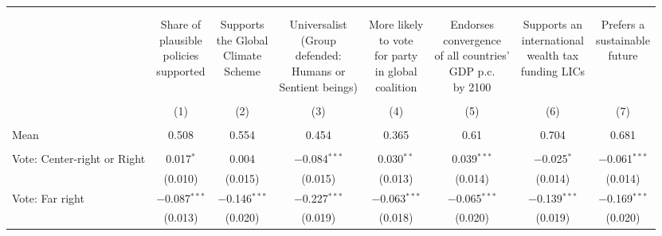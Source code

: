 
\begin{tabular}{@{\extracolsep{5pt}}lccccccc} 
\\[-1.8ex]\hline 
\hline \\[-1.8ex] 
\\[-1.8ex] & \makecell{Share of\\plausible\\policies\\supported} & \makecell{Supports\\the Global\\Climate\\Scheme} & \makecell{Universalist\\(Group\\defended:\\Humans or\\Sentient beings)} & \makecell{More likely\\to vote\\for party\\in global\\coalition} & \makecell{Endorses\\convergence\\of all countries'\\GDP p.c.\\by 2100} & \makecell{Supports an\\international\\wealth tax\\funding LICs} & \makecell{Prefers a\\sustainable\\future} \\ 
\\[-1.8ex] & (1) & (2) & (3) & (4) & (5) & (6) & (7)\\ 
\hline \\[-1.8ex] 
Mean & 0.508 & 0.554 & 0.454 & 0.365 & 0.61 & 0.704 & 0.681  \\ \hline \\[-1.8ex]
 Vote: Center\mbox{-}right or Right & 0.017$^{*}$ & 0.004 & $-$0.084$^{***}$ & 0.030$^{**}$ & 0.039$^{***}$ & $-$0.025$^{*}$ & $-$0.061$^{***}$ \\ 
  & (0.010) & (0.015) & (0.015) & (0.013) & (0.014) & (0.014) & (0.014) \\ 
  Vote: Far right & $-$0.087$^{***}$ & $-$0.146$^{***}$ & $-$0.227$^{***}$ & $-$0.063$^{***}$ & $-$0.065$^{***}$ & $-$0.139$^{***}$ & $-$0.169$^{***}$ \\ 
  & (0.013) & (0.020) & (0.019) & (0.018) & (0.020) & (0.019) & (0.020) \\ 

\end{tabular}
